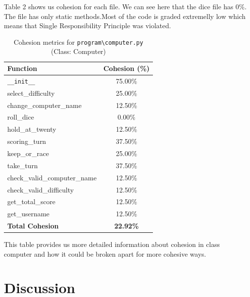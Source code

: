 \documentclass{article}
\begin{document}
Table 2 shows us cohesion for each file. We can see here that the dice file has 0\%. The file has only static methods.Most of the code is graded extremelly low which means that Single Responsibility Principle was violated.

\begin{table}[H]
    \centering
    \begin{tabular}{|l | c|}
        \hline
        \textbf{Function}            & \textbf{Cohesion (\%)} \\
        \hline
        \texttt{\_\_init\_\_}        & 75.00\%                \\
        select\_difficulty           & 25.00\%                \\
        change\_computer\_name       & 12.50\%                \\
        roll\_dice                   & 0.00\%                 \\
        hold\_at\_twenty             & 12.50\%                \\
        scoring\_turn                & 37.50\%                \\
        keep\_or\_race               & 25.00\%                \\
        take\_turn                   & 37.50\%                \\
        check\_valid\_computer\_name & 12.50\%                \\
        check\_valid\_difficulty     & 12.50\%                \\
        get\_total\_score            & 12.50\%                \\
        get\_username                & 12.50\%                \\
        \hline
        \textbf{Total Cohesion}      & \textbf{22.92\%}       \\
        \hline
    \end{tabular}
    \caption{Cohesion metrics for \texttt{program\textbackslash computer.py} (Class: Computer)}
\end{table}

This table provides us more detailed information about cohesion in class computer and how it could be broken apart for more cohesive ways.  

\newpage

\section{Discussion}
\end{document}
